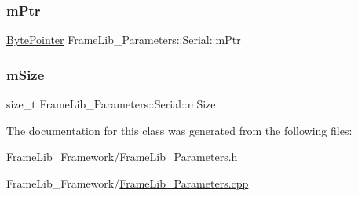 \mbox{\label{class_frame_lib___parameters_1_1_serial_a28ea665fc997bfdef3947079505ece1f}} 
\subsubsection{\texorpdfstring{m\+Ptr}{mPtr}}
{\footnotesize\ttfamily \hyperlink{_frame_lib___types_8h_a2c5689a997a12479b7d925e565428141}{Byte\+Pointer} Frame\+Lib\+\_\+\+Parameters\+::\+Serial\+::m\+Ptr\hspace{0.3cm}{\ttfamily [protected]}}

\mbox{\label{class_frame_lib___parameters_1_1_serial_a348d0da027db94981ccf75c939d46a98}} 
\subsubsection{\texorpdfstring{m\+Size}{mSize}}
{\footnotesize\ttfamily size\+\_\+t Frame\+Lib\+\_\+\+Parameters\+::\+Serial\+::m\+Size\hspace{0.3cm}{\ttfamily [protected]}}



The documentation for this class was generated from the following files\+:\begin{DoxyCompactItemize}
\item 
Frame\+Lib\+\_\+\+Framework/\hyperlink{_frame_lib___parameters_8h}{Frame\+Lib\+\_\+\+Parameters.\+h}\item 
Frame\+Lib\+\_\+\+Framework/\hyperlink{_frame_lib___parameters_8cpp}{Frame\+Lib\+\_\+\+Parameters.\+cpp}\end{DoxyCompactItemize}
